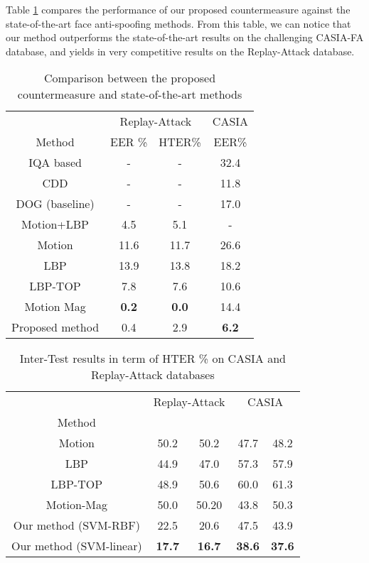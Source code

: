 \documentclass{article}
\begin{document}
Table \ref{comp} compares the performance of our proposed countermeasure against the state-of-the-art face anti-spoofing methods. From this table, we can notice that our method outperforms the state-of-the-art results on the challenging CASIA-FA database, and yields in very competitive results on the Replay-Attack database.
	
\vspace{-4mm}
		\begin{table}[h]
		\small
			\centering
	\caption{Comparison between the proposed countermeasure and state-of-the-art methods}
\label{comp}
	\setlength{\tabcolsep}{0.35cm}
		\begin{tabular}{|c|c|c|c|}
		\hline
	       & \multicolumn{2}{c|}{Replay-Attack} & CASIA\\
			\cline{2-4}
	    Method & EER \% & HTER\%& EER\%\\
			\hline \hline
			IQA based \cite{IQA}&- &- & 32.4\\
			\hline
			CDD \cite{low_level_high_level}& - & - & 11.8\\
			\hline
			DOG (baseline)\cite{casia}& - & -&17.0\\
			\hline						
			Motion+LBP \cite{motion_lbp}& 4.5 & 5.1&- \\
			\hline 
			Motion \cite{motion_casia}&11.6 &11.7&26.6 \\
					\hline 
			LBP \cite{replay}& 13.9 & 13.8&18.2 \\
			\hline 
			LBP-TOP \cite{lbp_top_replay}& 7.8   & 7.6&10.6 \\
			\hline 
			Motion Mag \cite{motion_mag}& \textbf{0.2}& \textbf{0.0}&14.4 \\
			\hline 
\hline 
			Proposed method&  0.4 & 2.9&\textbf{6.2}\\
			\hline
	 \end{tabular}	
	\end{table} 
\vspace{-3mm}
		\begin{table}[h]
			\centering
	\caption{Inter-Test results in term of  HTER \%  on CASIA and Replay-Attack databases}
		\small
	\label{cross_database}
	\setlength{\tabcolsep}{0.22cm}
		\begin{tabular}{|c|c|c|c|c|}
		\hline
		 & \multicolumn{2}{c|}{Replay-Attack}&\multicolumn{2}{c|}{CASIA }\\
		\cline{2-5}
		Method& &&&\\
		\hline
     Motion\cite{motion_casia}&50.2&50.2&47.7&48.2\\
    \hline
    LBP \cite{motion_casia}&44.9&47.0&57.3&57.9\\
    \hline
    LBP-TOP \cite{motion_casia}&48.9&50.6&60.0&61.3\\
    \hline
		Motion-Mag\cite{motion_mag}&50.0&50.20&43.8&50.3\\
		 \hline
\hline
		Our method (SVM-RBF)&22.5 &20.6 &47.5&43.9\\
		    \hline
			Our method (SVM-linear)&\textbf{17.7}&\textbf{16.7}&\textbf{38.6}&\textbf{37.6}\\
		    \hline
	 \end{tabular}	
	\end{table} 	
\end{document}
